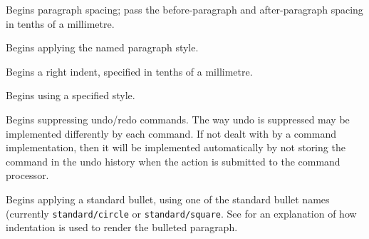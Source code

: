 Begins paragraph spacing; pass the before-paragraph and after-paragraph spacing in tenths of
a millimetre.

\label{wxrichtextbufferbeginparagraphstyle}


Begins applying the named paragraph style.

\label{wxrichtextbufferbeginrightindent}


Begins a right indent, specified in tenths of a millimetre.

\label{wxrichtextbufferbeginstyle}


Begins using a specified style.

\label{wxrichtextbufferbeginsuppressundo}


Begins suppressing undo/redo commands. The way undo is suppressed may be implemented
differently by each command. If not dealt with by a command implementation, then
it will be implemented automatically by not storing the command in the undo history
when the action is submitted to the command processor.

\label{wxrichtextbufferbeginstandardbullet}


Begins applying a standard bullet, using one of the standard bullet names (currently {\tt standard/circle} or {\tt standard/square}.
See  for an explanation of how indentation is used to render the bulleted paragraph.

\label{wxrichtextbufferbeginsymbolbullet}


